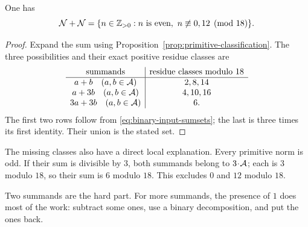 \begin{proposition}\label{prop:primitive-binary}
One has
\[
\NN+\NN
=\{n\in\Z_{>0}:n\text{ is even},\ n\not\equiv0,12\pmod{18}\}.
\]
\end{proposition}
\begin{proof}
Expand the sum using Proposition~\ref{prop:primitive-classification}.
The three possibilities and their exact positive residue classes are
\[
\begin{array}{c|c}
\text{summands}&\text{residue classes modulo }18\\ \hline
 a+b\quad(a,b\in\AA)&2,8,14\\
 a+3b\quad(a,b\in\AA)&4,10,16\\
 3a+3b\quad(a,b\in\AA)&6.
\end{array}
\]
The first two rows follow from \eqref{eq:binary-input-sumsets}; the last
is three times its first identity. Their union is the stated set.
\end{proof}
The missing classes also have a direct local explanation. Every primitive
norm is odd. If their sum is divisible by $3$, both summands belong to
$3\!\cdot\!\AA$; each is $3$ modulo $18$, so their sum is $6$ modulo
$18$. This excludes $0$ and $12$ modulo $18$.

Two summands are the hard part. For more summands, the presence of $1$
does most of the work: subtract some ones, use a binary decomposition,
and put the ones back.

